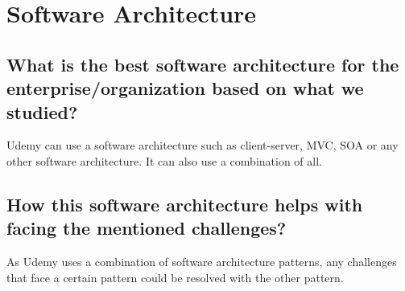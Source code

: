 \documentclass{book}
\begin{document}
\chapter{Software Architecture}
\section{What is the best software architecture for the enterprise/organization based on what we studied?}
Udemy can use a software architecture such as client-server, MVC,  SOA or any other software architecture. It can also use a combination of all.

\section{How this software architecture helps with facing the mentioned challenges?}
As Udemy uses a combination of software architecture patterns, any challenges that face a certain pattern could be resolved with the other pattern.
\end{document}
